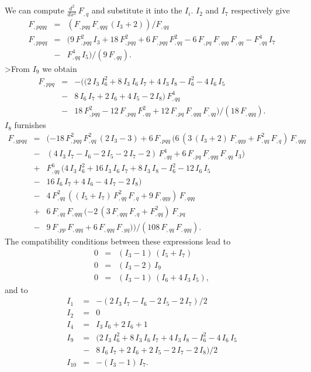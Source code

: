 We can compute $\frac{d^{2}}{dx^{2}}\,F_{,q}$ and substitute it into the 
$I_{i}$. $I_{2}$ and $I_{7}$ respectively give
\begin{eqnarray}
F_{,pqqq}&=&(F_{,pqq}\,F_{,qqq}\,(I_{3} + 2))/F_{,qq} \\
%
F_{,ppqq}&=&(9\,F_{,pqq}^{2}\,I_{3} + 18\,F_{,pqq}^{2} 
+ 6\,F_{,pqq}\,F_{,qq}^{2} - 6\,F_{,pq}\,F_{,qqq}\,F_{,qq} 
- F_{,qq}^{4}\,I_{7} 
\nonumber \\&-& F_{,qq}^{4}\,I_{5})/(9\,F_{,qq}).
\end{eqnarray}
>From $I_{9}$ we obtain
\begin{eqnarray}
F_{,ppq}&=& - ((2\,I_{3}\,I_{6}^{2} + 8\,I_{3}\,I_{6}\,I_{7} + 4\,I_{3}\,I_{8} 
- I_{6}^{2} - 4\,I_{6}\,I_{5} \nonumber \\
&-& 8\,I_{6}\,I_{7} + 2\,I_{6} + 4\,I_{5} - 2\,I_{8})\,F_{,qq}^{4} \nonumber \\
&-& 18\,F_{,pqq}^{2} - 12\,F_{,pqq}\,F_{,qq}^{2} 
+ 12\,F_{,pq}\,F_{,qqq}\,F_{,qq})/(18\,F_{,qqq}).
\end{eqnarray}
$I_{8}$ furnishes
\begin{eqnarray}
F_{,ypqq}&=&( - 18\,F_{,pqq}^{2}\,F_{,qq}^{2}\,(2\,I_{3} - 3) 
+ 6\,F_{,pqq}\,(6\,(3\,(I_{3} + 2)\,F_{,qqy}+ F_{,qq}^{2}\,F_{,q})\,F_{,qqq} 
\nonumber \\&-& (4\,I_{3}\,I_{7} - I_{6} - 2\,I_{5} - 2\,I_{7} 
- 2)\,F_{,qq}^{4} + 6\,F_{,pq}\,F_{,qqq}\,F_{,qq}\,I_{3}) \nonumber \\
&+& F_{,qq}^{6}\,(4\,I_{3}\,I_{6}^{2}
+ 16\,I_{3}\,I_{6}\,I_{7} + 8\,I_{3}\,I_{8} - I_{6}^{2} - 12\,I_{6}\,I_{5} 
\nonumber \\&-& 16\,I_{6}\,I_{7}+ 4\,I_{6} - 4\,I_{7} - 2\,I_{8}) \nonumber \\
&-& 4\,F_{,qq}^{2}\,((I_{5} + I_{7})\,F_{,qq}^{2}\,F_{,q}
+ 9\,F_{,qqy})\,F_{,qqq} \nonumber \\
&+& 6\,F_{,qq}\,F_{,qqq}\,( - 2\,(3\,F_{,qqq}\,F_{,q} 
+ F_{,qq}^{2})\,F_{,pq} \nonumber \\
&-& 9\,F_{,pp}\,F_{,qqq} + 6\,F_{,qqq}\,F_{,yq}))/(108\,F_{,qq}\,F_{,qqq}).
\end{eqnarray}
The compatibility conditions between these expressions lead to 
\begin{eqnarray}
0&=&(I_{3}-1)\,(I_{5}+I_{7}) \\
0&=&(I_{3}-2)\,I_{9} \\
0&=&(I_{3}-1)\,(I_{6}+4\,I_{3}\,I_{5}),
\end{eqnarray}
and to 
\begin{eqnarray}
I_{1}&=& - (2\,I_{3}\,I_{7} - I_{6} - 2\,I_{5} - 2\,I_{7})/2 \\
I_{2}&=&0 \\
I_{4}&=&I_{3}\,I_{6} + 2\,I_{6} + 1 \\
I_{9}&=&(2\,I_{3}\,I_{6}^{2} + 8\,I_{3}\,I_{6}\,I_{7} + 4\,I_{3}\,I_{8} 
- I_{6}^{2} - 4\,I_{6}\,I_{5} \nonumber \\
&-& 8\,I_{6}\,I_{7} + 2\,I_{6} + 2\,I_{5} - 2\,I_{7} - 2\,I_{8})/2 \\
I_{10}&=& - (I_{3} - 1)\,I_{7}.
\end{eqnarray}

